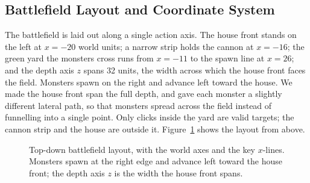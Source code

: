 \documentclass[12pt,a4paper]{report}
\begin{document}
\subsection{Battlefield Layout and Coordinate System}

The battlefield is laid out along a single action axis. The house front stands
on the left at $x=-20$ world units; a narrow strip holds the cannon at $x=-16$;
the green yard the monsters cross runs from $x=-11$ to the spawn line at $x=26$;
and the depth axis $z$ spans 32 units, the width across which the house front
faces the field. Monsters spawn on the right and advance left toward the house.
We made the house front span the full depth, and gave each monster a slightly
different lateral path, so that monsters spread across the field instead of
funnelling into a single point. Only clicks inside the yard are valid targets;
the cannon strip and the house are outside it. Figure~\ref{fig:field} shows the
layout from above.

\begin{figure}[htbp]
\centering
{}
\caption{Top-down battlefield layout, with the world axes and the key
$x$-lines. Monsters spawn at the right edge and advance left toward the house
front; the depth axis $z$ is the width the house front spans.}
\label{fig:field}
\end{figure}
\end{document}
